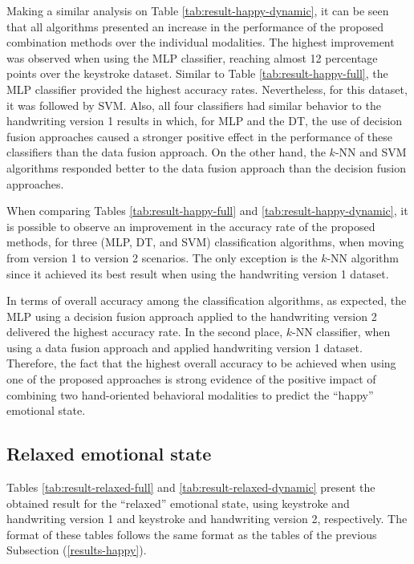 \documentclass[conference]{IEEEtran}
\begin{document}
Making a similar analysis on Table \ref{tab:result-happy-dynamic}, it can be seen that all algorithms presented an increase in the performance of the proposed combination methods over the individual modalities. The highest improvement was observed when using the MLP classifier, reaching almost 12 percentage points over the keystroke dataset.
Similar to Table \ref{tab:result-happy-full}, the MLP classifier provided the highest accuracy rates. Nevertheless, for this dataset, it was followed by  SVM. Also, all four classifiers had similar behavior to the handwriting version 1 results in which, for MLP and the DT, the use of decision fusion approaches caused a stronger positive effect in the performance of these classifiers than the data fusion approach. On the other hand, the $k$-NN and SVM algorithms responded better to the data fusion approach than the decision fusion approaches.

When comparing Tables \ref{tab:result-happy-full} and  \ref{tab:result-happy-dynamic}, it is possible to observe an improvement in the accuracy rate of the proposed methods, for three (MLP, DT, and SVM) classification algorithms, when moving from version 1 to version 2 scenarios. The only exception is the $k$-NN algorithm since it achieved its best result when using the handwriting version 1 dataset.

In terms of overall accuracy among the classification algorithms, as expected,  the MLP using a decision fusion approach applied to the handwriting version 2 delivered the highest accuracy rate. In the second place, $k$-NN classifier, when using a data fusion approach and applied handwriting version 1 dataset. 
Therefore, the fact that the highest overall accuracy to be achieved when using one of the proposed approaches is strong evidence of the positive impact of combining two hand-oriented behavioral modalities to predict the ``happy'' emotional state.


\subsection{Relaxed emotional state}
\label{results-relaxed}

Tables \ref{tab:result-relaxed-full} and \ref{tab:result-relaxed-dynamic} present the obtained result for the ``relaxed'' emotional state,  using   keystroke and handwriting version 1 and keystroke and handwriting version 2, respectively. The format of these tables follows the same format as the tables of the previous Subsection (\ref{results-happy}).
\end{document}

